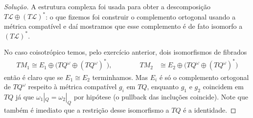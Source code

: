 \begin{proof}[Solução]
	A estrutura complexa foi usada para obter a descomposição $T\mathcal{L}\oplus (T\mathcal{L})^*$: o que fizemos foi construir o complemento ortogonal usando a métrica compatível e daí mostramos que esse complemento é de fato isomorfo a $(T\mathcal{L})^*$.

	No caso coisotrópico temos, pelo exercício anterior, dois isomorfismos de fibrados
\begin{align*}TM_1\cong E_1\oplus \Big(TQ^\omega\oplus (TQ^\omega)^*\Big),\qquad \qquad 
TM_2&\cong E_2\oplus \Big(TQ^\omega\oplus (TQ^\omega)^*\Big)
\end{align*}
então é claro que se $E_1\cong E_2$ terminhamos. Mas $E_i$ é só o complemento ortogonal de $TQ^\omega$ respeito à métrica compatível $g_i$ em $TQ$, enquanto $g_1$ e $g_2$ coincidem em $TQ$ já que $\omega_1|_{Q}=\omega_2|_{Q}$ por hipótese (o pullback das incluções coincide). Note que também é imediato que a restrição desse isomorfismo a $TQ$  é a identidade.
\end{proof}


